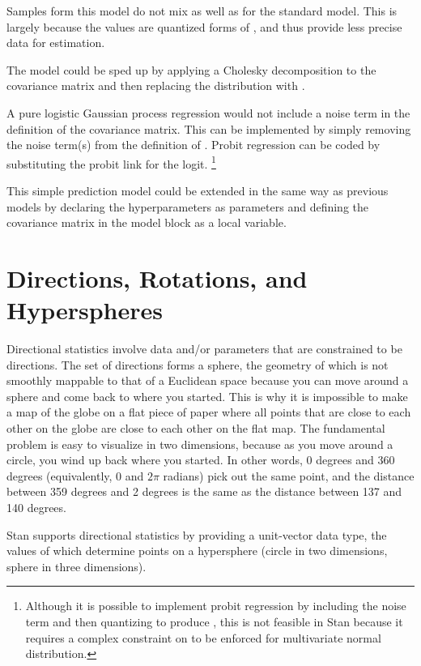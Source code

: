 Samples form this model do not mix as well as for the standard model.
This is largely because the  values are quantized forms of
, and thus provide less precise data for estimation.  

The model could be sped up by applying a Cholesky decomposition to the
covariance matrix  and then replacing the
 distribution with .

A pure logistic Gaussian process regression would not include a noise
term in the definition of the covariance matrix.  This can be
implemented by simply removing the noise term(s)  from
the definition of .  Probit regression can be coded by
substituting the probit link for the logit.%
%
\footnote{Although it is possible to implement probit regression by
  including the noise term  and then quantizing
   to produce , this is not feasible in Stan
  because it requires a complex constraint on  to be enforced
  for multivariate normal distribution.}

This simple prediction model could be extended in the same way as
previous models by declaring the hyperparameters as parameters and
defining the covariance matrix in the model block as a local variable.


\chapter{Directions, Rotations, and Hyperspheres}

Directional statistics involve data and/or parameters that are
constrained to be directions.  The set of directions forms a sphere,
the geometry of which is not smoothly mappable to that of a Euclidean
space because you can move around a sphere and come back to where you
started.  This is why it is impossible to make a map of the globe on a
flat piece of paper where all points that are close to each other on
the globe are close to each other on the flat map.  The fundamental
problem is easy to visualize in two dimensions, because as you move
around a circle, you wind up back where you started.  In other words,
0 degrees and 360 degrees (equivalently, 0 and $2 \pi$ radians) pick
out the same point, and the distance between 359 degrees and 2 degrees
is the same as the distance between 137 and 140 degrees.

Stan supports directional statistics by providing a unit-vector data
type, the values of which determine points on a hypersphere (circle in
two dimensions, sphere in three dimensions).

